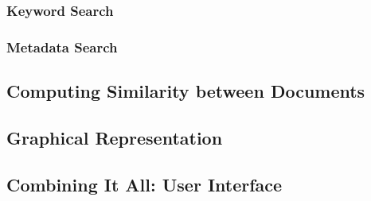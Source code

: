 \subsubsection{Keyword Search}\label{sec:keyword_search}

\subsubsection{Metadata Search}\label{sec:metadata_search}

\subsection{Computing Similarity between Documents}\label{sec:computing_similarity_between_documents}


\subsection{Graphical Representation}\label{sec:graphical_representation}

	
\subsection{Combining It All: User Interface}\label{sec:combining_it_all:_user_interface}
